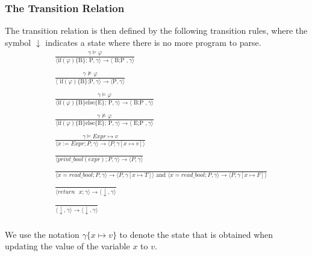 \documentclass{article}
\begin{document}
\subsubsection{The Transition Relation}
The transition relation is then defined by the following transition rules, where the symbol $\downarrow$ indicates a state where there is no more program to parse.
\begin{align*}
    &\; \frac{\gamma \vDash \varphi}{\langle \text{if}(\varphi)\text{\{B\}; P}, \gamma \rangle \rightarrow \langle \text{ B;P }, \gamma \rangle} \\ \\
    &\; \frac{\gamma \nvDash \varphi}{\langle \text{ if}(\varphi)\text{\{B\};P}, \gamma \rangle \rightarrow \langle \text{P}, \gamma \rangle} \\ \\
    &\; \frac{\gamma \vDash \varphi}{\langle \text{if}(\varphi)\text{\{B\}else\{E\}; P}, \gamma \rangle \rightarrow \langle \text{ B;P }, \gamma \rangle} \\ \\
    &\; \frac{\gamma \nvDash \varphi}{\langle \text{if}(\varphi)\text{\{B\}else\{E\}; P}, \gamma \rangle \rightarrow \langle \text{ E;P }, \gamma \rangle} \\ \\
    &\;\frac{\gamma \vDash Expr \mapsto v}{\langle x:=Expr;P , \gamma \rangle \rightarrow \langle P,\gamma[x \mapsto v] \rangle } \\  \\
    &\;\frac{}{\langle print\_bool(expr);P , \gamma\rangle \rightarrow \langle P, \gamma \rangle} \\  \\
    &\;\frac{}{\langle x=read\_bool;P , \gamma \rangle \rightarrow \langle P,\gamma[x \mapsto T] \rangle \text{ and } \langle x=read\_bool;P , \gamma \rangle \rightarrow \langle P,\gamma[x \mapsto F] \rangle}\\ \\
    &\;\frac{}{\langle return \text{ } x; \gamma \rangle \rightarrow \langle \downarrow, \gamma \rangle} \\ \\
    &\;\frac{}{\langle \downarrow, \gamma \rangle \rightarrow \langle \downarrow, \gamma \rangle} \\
\end{align*}

We use the notation $\gamma\{x \mapsto v\}$ to denote the state that is obtained when updating the value of the variable $x$ to $v$. 
\end{document}
